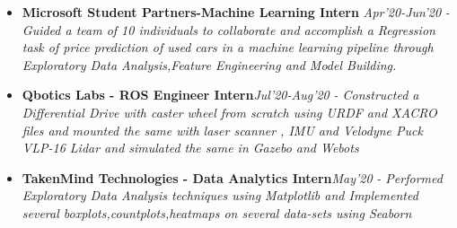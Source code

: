 \documentclass{article}
\begin{document}
\begin{itemize}
    \item{\textbf{\large{Microsoft Student Partners-Machine Learning Intern}}} \hfill \textit{Apr'20-Jun'20}
          \newline
          \textit{-Guided a team of 10 individuals to collaborate and accomplish a Regression task of price prediction of used cars in a machine learning pipeline through Exploratory Data Analysis,Feature Engineering and Model Building.}

\end{itemize}


\begin{itemize}
    \item{\textbf{\large{Qbotics Labs - ROS Engineer Intern}}}\hfill \textit{Jul'20-Aug'20}
          \newline
          \textit{- Constructed a Differential Drive with caster wheel from scratch using URDF and XACRO files and mounted the same with laser scanner , IMU and Velodyne Puck VLP-16 Lidar and simulated the same in Gazebo and Webots}
\end{itemize}

\begin{itemize}
    \item{\textbf{\large{TakenMind Technologies - Data Analytics Intern}}}\hfill \textit{May'20}
          \newline
          \textit{- Performed Exploratory Data Analysis techniques using Matplotlib and
              Implemented several boxplots,countplots,heatmaps on several data-sets using Seaborn }
\end{itemize}


\end{document}
